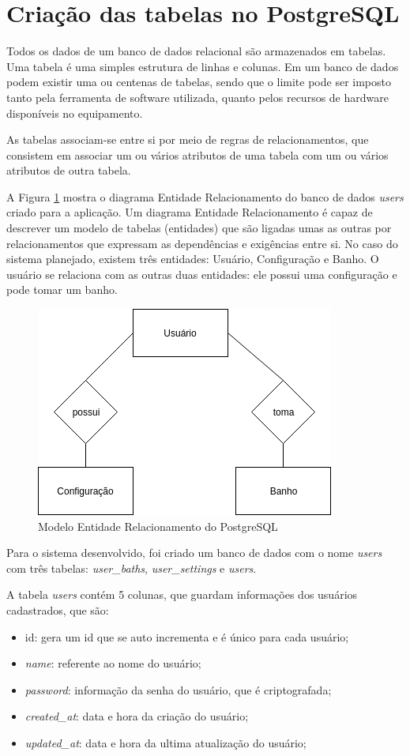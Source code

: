 \section{Criação das tabelas no PostgreSQL}

Todos os dados de um banco de dados relacional são armazenados em tabelas. Uma tabela é uma simples estrutura de linhas e colunas. Em um banco de dados podem existir uma ou centenas de tabelas, sendo que o limite pode ser imposto tanto pela ferramenta de software utilizada, quanto pelos recursos de hardware disponíveis no equipamento.

As tabelas associam-se entre si por meio de regras de relacionamentos, que consistem em associar um ou vários atributos de uma tabela com um ou vários atributos de outra tabela.

\newpage

A Figura \ref{fig:erpostgre} mostra o diagrama Entidade Relacionamento do banco de dados \textit{users} criado para a aplicação. Um diagrama Entidade Relacionamento é capaz de descrever um modelo de tabelas (entidades) que são ligadas umas as outras por relacionamentos que expressam as dependências e exigências entre si. No caso do sistema planejado, existem três entidades: Usuário, Configuração e Banho. O usuário se relaciona com as outras duas entidades: ele possui uma configuração e pode tomar um banho.

\begin{figure}[htbp]
	\centering
	\includegraphics[width=0.6\linewidth]{figuras/ERPostgre.png}
	\caption{Modelo Entidade Relacionamento do PostgreSQL}
	\label{fig:erpostgre}
\end{figure}

Para o sistema desenvolvido, foi criado um banco de dados com o nome \textit{users} com três tabelas: \textit{user\_baths}, \textit{user\_settings} e \textit{users}.

A tabela \textit{users} contém 5 colunas, que guardam informações dos usuários cadastrados, que são:
\begin{itemize}
	\item id: gera um id que se auto incrementa e é único para cada usuário;
	\item \textit{name}: referente ao nome do usuário;
	\item \textit{password}: informação da senha do usuário, que é criptografada;
	\item \textit{created\_at}: data e hora da criação do usuário;
	\item \textit{updated\_at}: data e hora da ultima atualização do usuário;
\end{itemize}

